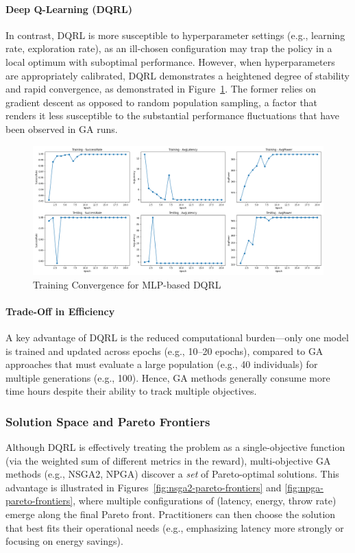\documentclass[preprint,12pt]{elsarticle}
\begin{document}
\paragraph{Deep Q-Learning (DQRL)}
In contrast, DQRL is more susceptible to hyperparameter settings (e.g., learning rate, exploration rate), as an ill-chosen configuration may trap the policy in a local optimum with suboptimal performance. However, when hyperparameters are appropriately calibrated, DQRL demonstrates a heightened degree of stability and rapid convergence, as demonstrated in Figure~\ref{fig:dqrl-mlp-training-epoch}. The former relies on gradient descent as opposed to random population sampling, a factor that renders it less susceptible to the substantial performance fluctuations that have been observed in GA runs.


\begin{figure}[H]
    \centering
    \includegraphics[width=1\linewidth]{figs/dqrl_mlp_training_epoch.png}
    \caption{Training Convergence for MLP-based DQRL}
    \label{fig:dqrl-mlp-training-epoch}
\end{figure}



\paragraph{Trade-Off in Efficiency}
A key advantage of DQRL is the reduced computational burden—only one model is trained and updated across epochs (e.g., 10–20 epochs), compared to GA approaches that must evaluate a large population (e.g., 40 individuals) for multiple generations (e.g., 100). Hence, GA methods generally consume more time hours despite their ability to track multiple objectives.

\subsubsection{Solution Space and Pareto Frontiers}
Although DQRL is effectively treating the problem as a single-objective function (via the weighted sum of different metrics in the reward), multi-objective GA methods (e.g., NSGA2, NPGA) discover a \emph{set} of Pareto-optimal solutions. This advantage is illustrated in Figures~\ref{fig:nsga2-pareto-frontiers} and \ref{fig:npga-pareto-frontiers}, where multiple configurations of (latency, energy, throw rate) emerge along the final Pareto front. Practitioners can then choose the solution that best fits their operational needs (e.g., emphasizing latency more strongly or focusing on energy savings).
\end{document}
